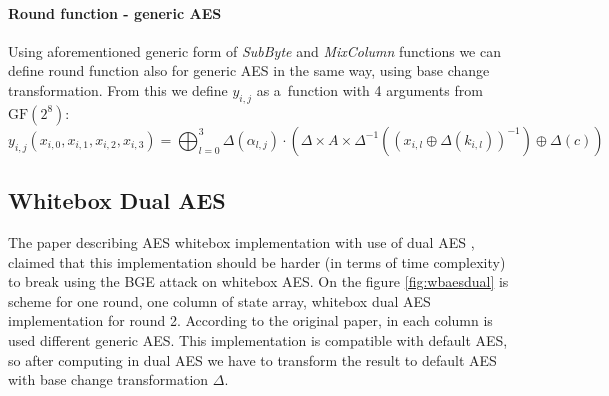 \documentclass[11pt,oneside,final]{fithesis2}
\newcommand{\gfe}{\ensuremath{\text{GF}\left(2^8\right)}}
\begin{document}
	\paragraph*{Round function - generic AES}
	Using aforementioned generic form of \emph{SubByte} and \emph{MixColumn} functions we can define round function also for generic AES in the same way, using base change transformation.
	From this we define $y_{i,j}$ as a~function with 4 arguments from $\gfe$:
	\begin{equation}
	y_{i,j}\left(x_{i,0}, x_{i,1}, x_{i,2}, x_{i,3}\right) = \bigoplus^3_{l=0} \Delta(\alpha_{l,j}) \cdot \left( \Delta \times A \times \Delta^{-1} \left( \left(x_{i,l} \oplus \Delta\left(k_{i,l}\right) \right)^{-1} \right) \oplus \Delta \left(c\right) \right)
	\end{equation}

	\subsection{Whitebox Dual AES}\label{sec:wb_dual_aes}
	The paper describing AES whitebox implementation with use of dual AES \citep{Karroumi:2010:PWA:2041036.2041060}, claimed that this implementation should be harder (in terms of time complexity)
	to break using the BGE attack on whitebox AES. On the figure \ref{fig:wbaesdual} is scheme for one round, one column of state array, whitebox dual AES implementation for round 2.
	According to the original paper, in each
	column is used different generic AES. This implementation is compatible with default AES, so after computing in dual AES we have to transform the result to default AES
	with base change transformation $\Delta$.\\
\end{document}
